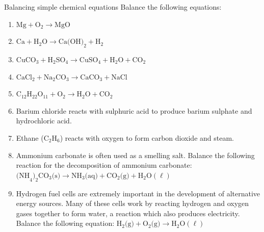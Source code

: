     \noindent
{}
            \begin{exercises}{ Balancing simple chemical equations
        }
            \nopagebreak \noindent
 \label{m38726*id65193}Balance the following equations:\par 
 \label{m38726*id65199}\begin{enumerate}[noitemsep, label=\textbf{\arabic*}. ] 
\item  $\text{Mg} + \text{O}_{2} \to \text{MgO}$
\item ${\text{Ca}}+{\text{H}}_{2}\text{O} \to \text{Ca(OH)}_{2} + \text{H}_{2}$
\item ${\text{CuCO}}_{3} + {\text{H}}_{2}{\text{SO}}_{4} \to \text{CuSO}_{4} + {\text{H}}_{2}\text{O} + {\text{CO}}_{2}$
\item $\text{CaCl}_{2} + {\text{Na}}_{2}{\text{CO}}_{3} \to \text{CaCO}_{3} + {\text{NaCl}}$        
\item ${\text{C}}_{12}{\text{H}}_{22}{\text{O}}_{11} + \text{O}_{2} \to \text{H}_{2}\text{O} + \text{CO}_{2}$
\item Barium chloride reacts with sulphuric acid to produce barium sulphate and hydrochloric acid.
\item Ethane (${\text{C}}_{2}{\text{H}}_{6}$) reacts with oxygen to form carbon dioxide and steam.
\item Ammonium carbonate is often used as a smelling salt. Balance the following reaction for the decomposition of ammonium carbonate: ${\text{(NH}}_{4}\text{)}_{2}{\text{CO}}_{3} \text{(s)} \to {\text{NH}}_{3}\text{(aq)} + {\text{CO}}_{2} \text{(g)} + \text{H}_{2}\text{O} (\ell)$ 
\item Hydrogen fuel cells are extremely important in the development of alternative energy sources. Many of these cells work by reacting hydrogen and oxygen gases together to form water, a reaction which also produces electricity. Balance the following equation: $\text{H}_{2} \text{(g)} + \text{O}_{2} \text{(g)} \to \text{H}_{2}\text{O} (\ell)$    

\end{enumerate}
\end{exercises}
